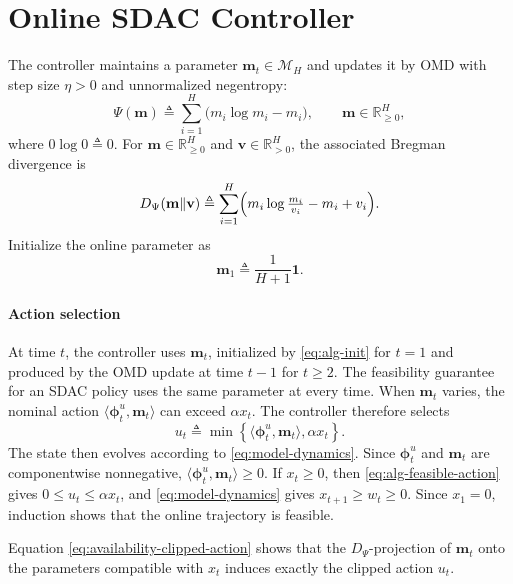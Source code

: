 \documentclass[journal]{IEEEtran}
\theoremstyle{remark}
\begin{document}
\section{Online SDAC Controller}
\label{sec:online-algorithm}

The controller maintains a parameter $\mathbf{m}_t\in\mathcal{M}_H$ and updates
it by OMD \cite{hazan2016introduction} with step size $\eta>0$ and unnormalized
negentropy:
\begin{equation}
\label{eq:def-negentropy}
\Psi(\mathbf{m}) \triangleq \sum_{i=1}^H\bigl(m_i\log m_i-m_i\bigr), \qquad
\mathbf{m}\in\mathbb{R}_{\ge0}^H,
\end{equation}
where $0\log0\triangleq0$. For $\mathbf{m}\in\mathbb{R}_{\ge0}^H$ and
$\mathbf{v}\in\mathbb{R}_{>0}^H$, the associated Bregman divergence is
\begin{equation}
\label{eq:def-bregman}
D_\Psi(\mathbf{m}\|\mathbf{v})
\triangleq
\sum_{i=1}^H\Bigl(m_i\log\tfrac{m_i}{v_i}-m_i+v_i\Bigr).
\end{equation}
Initialize the online parameter as
\begin{equation}
\label{eq:alg-init}
\mathbf{m}_1\triangleq\frac{1}{H+1}\mathbf{1}.
\end{equation}

\paragraph{Action selection}
At time $t$, the controller uses $\mathbf{m}_t$, initialized by
\eqref{eq:alg-init} for $t=1$ and produced by the OMD update at time $t-1$
for $t\ge2$. The feasibility guarantee for an SDAC policy uses the same parameter at every
time. When $\mathbf{m}_t$ varies, the
nominal action $\langle\boldsymbol{\phi}_t^u,\mathbf{m}_t\rangle$ can exceed
$\alpha x_t$. The controller therefore selects
\begin{equation}
\label{eq:alg-feasible-action}
u_t
\triangleq
\min\!\left\{
\langle\boldsymbol{\phi}_t^u,\mathbf{m}_t\rangle,
\alpha x_t
\right\}.
\end{equation}
The state then evolves according to \eqref{eq:model-dynamics}.
Since $\boldsymbol{\phi}_t^u$ and $\mathbf{m}_t$ are componentwise nonnegative,
$\langle\boldsymbol{\phi}_t^u,\mathbf{m}_t\rangle\ge0$. If $x_t\ge0$, then
\eqref{eq:alg-feasible-action} gives $0\le u_t\le\alpha x_t$, and
\eqref{eq:model-dynamics} gives $x_{t+1}\ge w_t\ge0$. Since $x_1=0$, induction
shows that the online trajectory is feasible.

Equation \eqref{eq:availability-clipped-action} shows that the $D_\Psi$-projection of
$\mathbf{m}_t$ onto the parameters compatible with $x_t$ induces exactly the
clipped action $u_t$.
\end{document}
